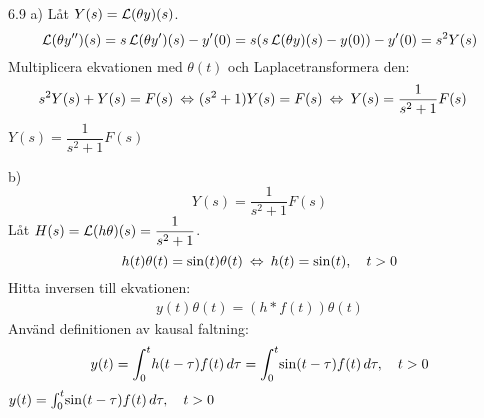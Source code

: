 \begin{task}{6.9 a)}
	Låt $Y(s)=\operatorname{\mathcal{L}}(\theta y)(s)$.
	\[\operatorname{\mathcal{L}}(\theta y'')(s)=s\operatorname{\mathcal{L}}(\theta y')(s)-y'(0)=s(s\operatorname{\mathcal{L}}(\theta y)(s)-y(0))-y'(0)=s^2Y(s)\]
	Multiplicera ekvationen med $\theta(t)$ och Laplacetransformera den:
	\begin{align*}
	&s^2Y(s)+Y(s)=F(s) \lra
	(s^2+1)Y(s)=F(s) \lra
	Y(s)=\frac{1}{s^2+1}F(s)
	\end{align*}
	\ans $Y(s)=\dfrac{1}{s^2+1}F(s)$
\end{task}


\begin{task}{b)}
	\[Y(s)=\frac{1}{s^2+1}F(s)\]
	Låt $H(s)=\operatorname{\mathcal{L}} (h\theta)(s)=\dfrac{1}{s^2+1}$.
	\[h(t)\theta(t)=\sin(t)\theta(t) \lra h(t)=\sin(t)\cond{t > 0}\]
	Hitta inversen till ekvationen:
	\begin{align*}
	y(t)\theta(t)=(h*f(t))\theta(t)
	\end{align*}
	Använd definitionen av kausal faltning:
	\begin{align*}
	y(t)=
	\int_{0}^{t}\!h(t-\tau)f(t)\, d\tau=
	\int_{0}^{t}\!\sin(t-\tau)f(t)\, d\tau, \quad t>0
	\end{align*}
	\ans $y(t)=\int_{0}^{t}\!\sin(t-\tau)f(t)\, d\tau, \quad t>0$
\end{task}
